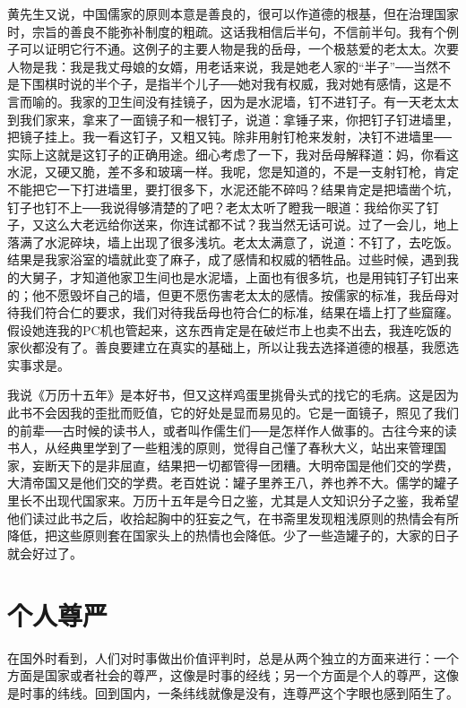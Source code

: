 黄先生又说，中国儒家的原则本意是善良的，很可以作道德的根基，但在治理国家时，宗旨的善良不能弥补制度的粗疏。这话我相信后半句，不信前半句。我有个例子可以证明它行不通。这例子的主要人物是我的岳母，一个极慈爱的老太太。次要人物是我：我是我丈母娘的女婿，用老话来说，我是她老人家的“半子”──当然不是下围棋时说的半个子，是指半个儿子──她对我有权威，我对她有感情，这是不言而喻的。我家的卫生间没有挂镜子，因为是水泥墙，钉不进钉子。有一天老太太到我们家来，拿来了一面镜子和一根钉子，说道：拿锤子来，你把钉子钉进墙里，把镜子挂上。我一看这钉子，又粗又钝。除非用射钉枪来发射，决钉不进墙里──实际上这就是这钉子的正确用途。细心考虑了一下，我对岳母解释道：妈，你看这水泥，又硬又脆，差不多和玻璃一样。我呢，您是知道的，不是一支射钉枪，肯定不能把它一下打进墙里，要打很多下，水泥还能不碎吗？结果肯定是把墙凿个坑，钉子也钉不上──我说得够清楚的了吧？老太太听了瞪我一眼道：我给你买了钉子，又这么大老远给你送来，你连试都不试？我当然无话可说。过了一会儿，地上落满了水泥碎块，墙上出现了很多浅坑。老太太满意了，说道：不钉了，去吃饭。结果是我家浴室的墙就此变了麻子，成了感情和权威的牺牲品。过些时候，遇到我的大舅子，才知道他家卫生间也是水泥墙，上面也有很多坑，也是用钝钉子钉出来的；他不愿毁坏自己的墙，但更不愿伤害老太太的感情。按儒家的标准，我岳母对待我们符合仁的要求，我们对待我岳母也符合仁的标准，结果在墙上打了些窟窿。假设她连我的PC机也管起来，这东西肯定是在破烂市上也卖不出去，我连吃饭的家伙都没有了。善良要建立在真实的基础上，所以让我去选择道德的根基，我愿选实事求是。 

我说《万历十五年》是本好书，但又这样鸡蛋里挑骨头式的找它的毛病。这是因为此书不会因我的歪批而贬值，它的好处是显而易见的。它是一面镜子，照见了我们的前辈──古时候的读书人，或者叫作儒生们──是怎样作人做事的。古往今来的读书人，从经典里学到了一些粗浅的原则，觉得自己懂了春秋大义，站出来管理国家，妄断天下的是非屈直，结果把一切都管得一团糟。大明帝国是他们交的学费，大清帝国又是他们交的学费。老百姓说：罐子里养王八，养也养不大。儒学的罐子里长不出现代国家来。万历十五年是今日之鉴，尤其是人文知识分子之鉴，我希望他们读过此书之后，收拾起胸中的狂妄之气，在书斋里发现粗浅原则的热情会有所降低，把这些原则套在国家头上的热情也会降低。少了一些造罐子的，大家的日子就会好过了。

\chapter{个人尊严}

在国外时看到，人们对时事做出价值评判时，总是从两个独立的方面来进行：一个方面是国家或者社会的尊严，这像是时事的经线；另一个方面是个人的尊严，这像是时事的纬线。回到国内，一条纬线就像是没有，连尊严这个字眼也感到陌生了。 

